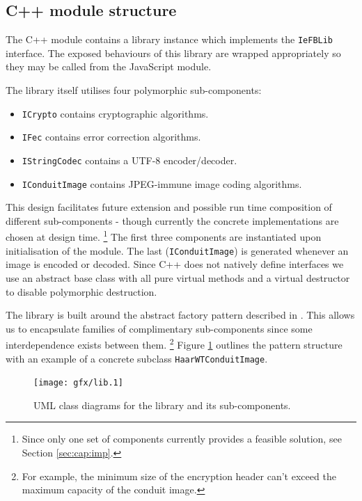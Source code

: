 \subsection{C++ module structure}
\label{sec:modstruct}

    The C++ module contains a library instance which implements the {\tt IeFBLib} interface. The exposed behaviours of this library are wrapped appropriately so they may be called from the JavaScript module.
    
    The library itself utilises four polymorphic sub-components:
    
    \begin{itemize}
    
        \item {\tt ICrypto} contains cryptographic algorithms.
        \item {\tt IFec} contains error correction algorithms.
        \item {\tt IStringCodec} contains a UTF-8 encoder/decoder.
        \item {\tt IConduitImage} contains JPEG-immune image coding algorithms.
    
    \end{itemize}
    
    This design facilitates future extension and possible run time composition of different sub-components - though currently the concrete implementations are chosen at design time. \footnote{Since only one set of components currently provides a feasible solution, see Section \ref{sec:cap:imp}.} The first three components are instantiated upon initialisation of the module. The last ({\tt IConduitImage}) is generated whenever an image is encoded or decoded. Since C++ does not natively define interfaces we use an abstract base class with all pure virtual methods and a virtual destructor to disable polymorphic destruction.
    
    The library is built around the abstract factory pattern described in \cite{dpatterns}. This allows us to encapsulate families of complimentary sub-components since some interdependence exists between them. \footnote{For example, the minimum size of the encryption header can't exceed the maximum capacity of the conduit image.} Figure \ref{uml:lib-classes} outlines the pattern structure with an example of a concrete subclass {\tt HaarWTConduitImage}.
    
    \begin{figure}[tb]
        \begin{center}
                \texttt{[image: gfx/lib.1]}
            \caption{UML class diagrams for the library and its sub-components.}
            \label{uml:lib-classes}
        \end{center}
    \end{figure}
    
